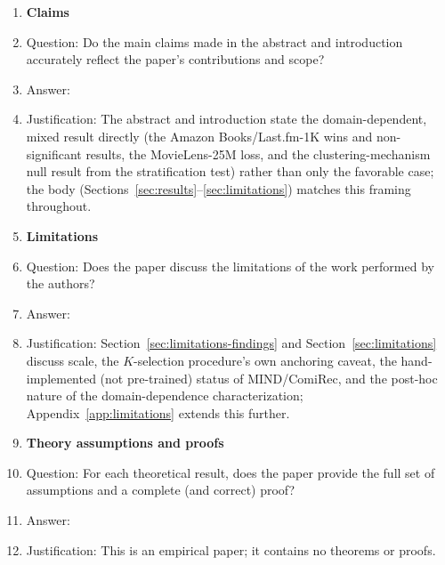 \documentclass{article}
\begin{document}
\begin{enumerate}

\item {\bf Claims}
    \item[] Question: Do the main claims made in the abstract and introduction accurately reflect the paper's contributions and scope?
    \item[] Answer: \answerYes{}
    \item[] Justification: The abstract and introduction state the domain-dependent, mixed result directly (the Amazon Books/Last.fm-1K wins and non-significant results, the MovieLens-25M loss, and the clustering-mechanism null result from the stratification test) rather than only the favorable case; the body (Sections~\ref{sec:results}--\ref{sec:limitations}) matches this framing throughout.

\item {\bf Limitations}
    \item[] Question: Does the paper discuss the limitations of the work performed by the authors?
    \item[] Answer: \answerYes{}
    \item[] Justification: Section~\ref{sec:limitations-findings} and Section~\ref{sec:limitations} discuss scale, the $K$-selection procedure's own anchoring caveat, the hand-implemented (not pre-trained) status of MIND/ComiRec, and the post-hoc nature of the domain-dependence characterization; Appendix~\ref{app:limitations} extends this further.

\item {\bf Theory assumptions and proofs}
    \item[] Question: For each theoretical result, does the paper provide the full set of assumptions and a complete (and correct) proof?
    \item[] Answer: \answerNA{}
    \item[] Justification: This is an empirical paper; it contains no theorems or proofs.


\end{enumerate}
\end{document}
